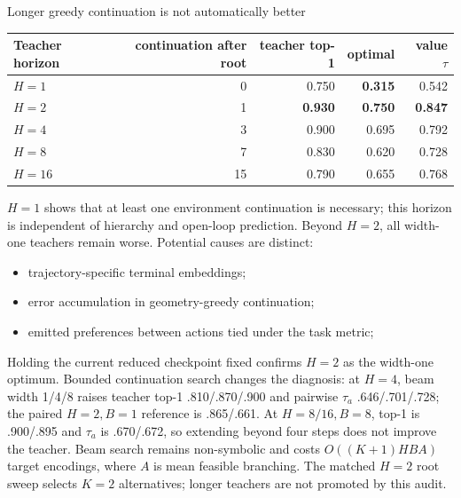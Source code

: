 \documentclass[aspectratio=169,10pt]{beamer}
\newcommand{\good}[1]{\textcolor{cgreen}{\textbf{#1}}}
\newcommand{\bad}[1]{\textcolor{cred}{\textbf{#1}}}
\begin{document}
\begin{frame}{Longer greedy continuation is not automatically better}
\small
\centering
\begin{tabular}{lrrrr}
\toprule
Teacher horizon & continuation after root & teacher top-1 & optimal & value $\tau$\\
\midrule
$H=1$ & 0 & 0.750 & \bad{0.315} & 0.542\\
$H=2$ & 1 & \good{0.930} & \good{0.750} & \good{0.847}\\
$H=4$ & 3 & 0.900 & 0.695 & 0.792\\
$H=8$ & 7 & 0.830 & 0.620 & 0.728\\
$H=16$ & 15 & 0.790 & 0.655 & 0.768\\
\bottomrule
\end{tabular}

\medskip
\raggedright
$H=1$ shows that at least one environment continuation is necessary; this
horizon is independent of hierarchy and open-loop prediction. Beyond $H=2$,
all width-one teachers remain worse. Potential causes are distinct:
\begin{itemize}
\item trajectory-specific terminal embeddings;
\item error accumulation in geometry-greedy continuation;
\item emitted preferences between actions tied under the task metric;
\end{itemize}

\scriptsize Holding the current reduced checkpoint fixed confirms $H=2$ as
the width-one optimum. Bounded continuation search changes the diagnosis:
at $H=4$, beam width 1/4/8 raises teacher top-1 .810/.870/.900 and pairwise
$\tau_a$ .646/.701/.728; the paired $H=2,B=1$ reference is .865/.661.
At $H=8/16,B=8$, top-1 is .900/.895 and $\tau_a$ is .670/.672, so extending
beyond four steps does not improve the teacher. Beam search remains
non-symbolic and costs $O((K+1)HBA)$ target encodings, where $A$ is mean
feasible branching. The matched $H=2$ root sweep selects $K=2$ alternatives;
longer teachers are not promoted by this audit.
\end{frame}
\end{document}
